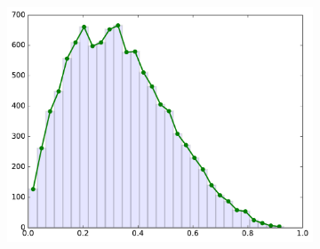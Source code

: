 \begin{figure}[H]
\begin{subfigure}{.325\textwidth}
    \includegraphics[width=\linewidth]{figures/line_vs_histogram_line.pdf}
\end{subfigure}
\end{figure}

